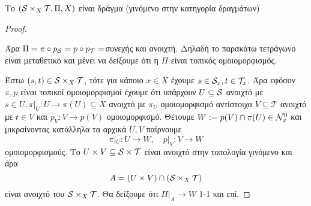 \begin{prop}
    Το $(\mathcal{S} \times_X \mathcal{T},\Pi,X)$ είναι δράγμα (γινόμενο στην κατηγορία δραγμάτων)
\end{prop}

\begin{proof} $ $
    
    \begin{figure}[H]
        \centering
    \end{figure}
\noindent Άρα $\Pi = \pi \circ p_{\mathcal{S}} = p \circ p_{\mathcal{T}} = $συνεχής και ανοιχτή. Δηλαδή το παρακάτω τετράγωνο είναι μεταθετικό και μένει να δείξουμε ότι η $\Pi$ είναι τοπικός ομοιομορφισμός.
\begin{figure}[H]
    \centering
\end{figure}

\noindent Έστω $(s,t) \in \mathcal{S} \times_X \mathcal{T}$, τότε για κάποιο $x \in X$ έχουμε $s \in \mathcal{S}_x, t \in \mathcal{T}_x$. Άρα εφόσον $\pi,p$ είναι τοπικοί ομοιομορφισμοί έχουμε ότι υπάρχουν $U\subseteq \mathcal{S}$ ανοιχτό με $s \in U, \pi|_U:U\rightarrow \pi(U) \subseteq X$ ανοιχτό με $\pi_U$ ομοιομορφισμό αντίστοιχα $V\subseteq \mathcal{T}$ ανοιχτό με $t \in V$ και $p_V:V\rightarrow p(V)$ ομοιομορφισμό. Θέτουμε $W := p(V)\cap \pi(U) \in \mathcal{N}^0_x$ και μικραίνοντας κατάλληλα τα αρχικά $U,V$ παίρνουμε 
$$\pi|_U :U\longrightarrow W, \quad p|_V:V\longrightarrow W$$ ομοιομορφισμούς. Το $U\times V\subseteq \mathcal{S}\times \mathcal{T}$ είναι ανοιχτό στην τοπολογία γινόμενο και άρα
$$A = \left(U\times V\right) \cap (\mathcal{S} \times_X \mathcal{T})$$ είναι ανοιχτό του $\mathcal{S} \times_X \mathcal{T}$. Θα δείξουμε ότι $\Pi|_A \rightarrow W$ 1-1 και επί.

\renewcommand{\qedsymbol}{}
\end{proof}



